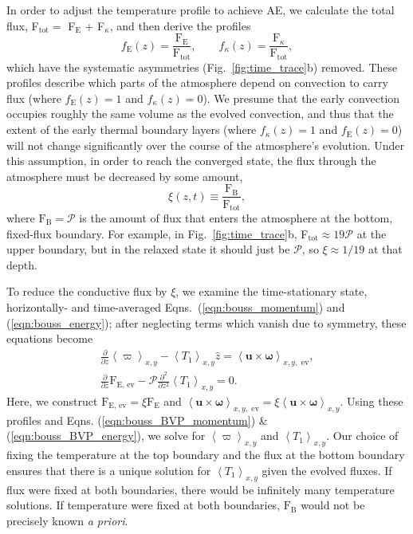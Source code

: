 \documentclass[aps, pre, onecolumn, nofootinbib, notitlepage, groupedaddress, amsfonts, amssymb, amsmath, longbibliography]{revtex4-1}
\newcommand{\angles}[1]{\ensuremath{\left\langle #1 \right\rangle}}
\begin{document}
In order to adjust the temperature profile to achieve AE, we calculate the total flux,
F$_{\text{tot}} =$ F$_{\text{E}}$ + F$_{\kappa}$, and then derive the profiles
\vspace{-0.5cm}
\begin{equation}
f_{\text{E}}(z) = \frac{\text{F}_{\text{E}}}{\text{F}_{\text{tot}}},\qquad
f_{\kappa}(z) = \frac{\text{F}_{\kappa}}{\text{F}_{\text{tot}}},
\label{eqn:bvp_ratios}
\end{equation}
which have the systematic asymmetries (Fig.~\ref{fig:time_trace}b) removed. These profiles describe which
parts of the atmosphere depend on convection to carry flux (where $f_{\text{E}}(z) = 1$
and $f_{\kappa}(z) = 0$).
We presume that the early convection occupies roughly the same volume as the evolved
convection, and thus that the extent of the early thermal boundary layers 
(where $f_{\kappa}(z) = 1$ and $f_{\text{E}}(z) = 0$) 
will not change significantly over the course of the atmosphere's evolution.
Under this assumption, in order to reach the converged state, 
the flux through the atmosphere must be decreased by some amount,
\vspace{-0.5cm}
\begin{equation}
\xi(z,t) \equiv \frac{\text{F}_{\text{B}}}{\text{F}_{\text{tot}}},
\label{eqn:xi}
\end{equation}
where $\text{F}_{\text{B}} = \mathcal{P}$ is the amount of flux that enters the
atmosphere at the bottom, fixed-flux boundary.
For example, in Fig.~\ref{fig:time_trace}b,
F$_{\text{tot}} \approx 19\mathcal{P}$ at the upper boundary,
but in the relaxed state 
it should just be $\mathcal{P}$, so $\xi \approx 1/19$ at that depth.

To reduce the conductive flux by $\xi$, we examine the 
time-stationary state, horizontally- and time-averaged
Eqns.~(\ref{eqn:bouss_momentum}) and (\ref{eqn:bouss_energy}); after 
neglecting terms which vanish due to symmetry, these equations become
\vspace{-0.2cm}
\begin{gather}
\frac{\partial}{\partial z}\angles{\varpi}_{x,y} - \angles{T_1}_{x,y}\hat{z} = \angles{\bm{u}\times\bm{\omega}}_{x,y, \text{ ev}},
	\label{eqn:bouss_BVP_momentum}
\\
\frac{\partial}{\partial z}\text{F}_{\text{E, ev}} - \mathcal{P}\frac{\partial^2}{\partial z^2} \angles{T_1}_{x,y} = 0.
	\label{eqn:bouss_BVP_energy}
\end{gather}
Here, we construct  $\text{F}_{\text{E, ev}} = \xi \text{F}_{\text{E}}$ 
and $\angles{\bm{u}\times\bm{\omega}}_{x, y,\text{ ev}}
= \xi\angles{\bm{u}\times\bm{\omega}}_{x, y}$.
Using these profiles and 
Eqns. (\ref{eqn:bouss_BVP_momentum}) \& (\ref{eqn:bouss_BVP_energy}),
we solve for $\angles{\varpi}_{x,y}$ and $\angles{T_1}_{x,y}$.
Our choice of fixing the temperature at the top boundary and the flux at the bottom
boundary ensures that there is a unique solution for $\angles{T_1}_{x,y}$ given the evolved
fluxes. If flux were fixed at both boundaries, there would be infinitely many
temperature solutions. If temperature were fixed at both boundaries, 
$\text{F}_{\text{B}}$ would not be precisely known \emph{a priori}.
\end{document}
